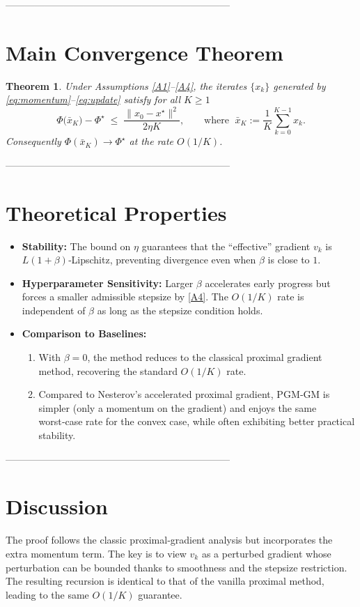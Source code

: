\documentclass{article}
\newtheorem{theorem}{Theorem}
\begin{document}
---------------------------------------------------------------------

\section*{Main Convergence Theorem}
\begin{theorem}\label{thm:main}
Under Assumptions \ref{A1}–\ref{A4}, the iterates $\{x_k\}$ generated by \eqref{eq:momentum}–\eqref{eq:update} satisfy for all $K\ge 1$
\[
\Phi\!\bigl(\bar{x}_{K}\bigr)-\Phi^{\star}
\;\le\;
\frac{\|x_{0}-x^{\star}\|^{2}}{2\eta K},
\qquad\text{where }\;
\bar{x}_{K}:=\frac{1}{K}\sum_{k=0}^{K-1}x_{k}.
\]
Consequently $\Phi(\bar{x}_{K})\to\Phi^{\star}$ at the rate $O(1/K)$.
\end{theorem}

---------------------------------------------------------------------

\section*{Theoretical Properties}
\begin{itemize}
\item \textbf{Stability:} The bound on $\eta$ guarantees that the ``effective'' gradient $v_k$ is $L(1+\beta)$‑Lipschitz, preventing divergence even when $\beta$ is close to $1$.
\item \textbf{Hyperparameter Sensitivity:} Larger $\beta$ accelerates early progress but forces a smaller admissible stepsize by \ref{A4}. The $O(1/K)$ rate is independent of $\beta$ as long as the stepsize condition holds.
\item \textbf{Comparison to Baselines:}
    \begin{enumerate}
    \item With $\beta=0$, the method reduces to the classical proximal gradient method, recovering the standard $O(1/K)$ rate.
    \item Compared to Nesterov’s accelerated proximal gradient, PGM‑GM is simpler (only a momentum on the gradient) and enjoys the same worst‑case rate for the convex case, while often exhibiting better practical stability.
    \end{enumerate}
\end{itemize}

---------------------------------------------------------------------

\section*{Discussion}
The proof follows the classic proximal‑gradient analysis but incorporates the extra momentum term. The key is to view $v_k$ as a perturbed gradient whose perturbation can be bounded thanks to smoothness and the stepsize restriction. The resulting recursion is identical to that of the vanilla proximal method, leading to the same $O(1/K)$ guarantee.
\end{document}
